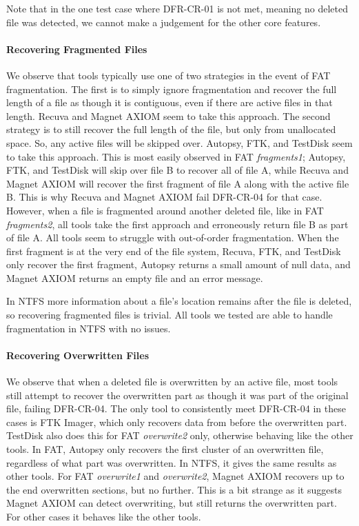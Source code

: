 Note that in the one test case where DFR-CR-01 is not met, meaning no deleted file was detected, we cannot make a judgement for the other core features.



\paragraph{Recovering Fragmented Files}
We observe that tools typically use one of two strategies in the event of FAT fragmentation.
The first is to simply ignore fragmentation and recover the full length of a file as though it is contiguous, even if there are active files in that length.
Recuva and Magnet AXIOM seem to take this approach.
The second strategy is to still recover the full length of the file, but only from unallocated space.
So, any active files will be skipped over.
Autopsy, FTK, and TestDisk seem to take this approach.
This is most easily observed in FAT \emph{fragments1}; Autopsy, FTK, and TestDisk will skip over file B to recover all of file A, while Recuva and Magnet AXIOM will recover the first fragment of file A along with the active file B.
This is why Recuva and Magnet AXIOM fail DFR-CR-04 for that case.
However, when a file is fragmented around another deleted file, like in FAT \emph{fragments2}, all tools take the first approach and erroneously return file B as part of file A.
All tools seem to struggle with out-of-order fragmentation.
When the first fragment is at the very end of the file system, Recuva, FTK, and TestDisk only recover the first fragment, Autopsy returns a small amount of null data, and Magnet AXIOM returns an empty file and an error message.

In NTFS more information about a file's location remains after the file is deleted, so recovering fragmented files is trivial.
All tools we tested are able to handle fragmentation in NTFS with no issues.


\paragraph{Recovering Overwritten Files}
We observe that when a deleted file is overwritten by an active file, most tools still attempt to recover the overwritten part as though it was part of the original file, failing DFR-CR-04.
The only tool to consistently meet DFR-CR-04 in these cases is FTK Imager, which only recovers data from before the overwritten part.
TestDisk also does this for FAT \emph{overwrite2} only, otherwise behaving like the other tools.
In FAT, Autopsy only recovers the first cluster of an overwritten file, regardless of what part was overwritten.
In NTFS, it gives the same results as other tools.
For FAT \emph{overwrite1} and \emph{overwrite2}, Magnet AXIOM recovers up to the end overwritten sections, but no further.
This is a bit strange as it suggests Magnet AXIOM can detect overwriting, but still returns the overwritten part.
For other cases it behaves like the other tools.

